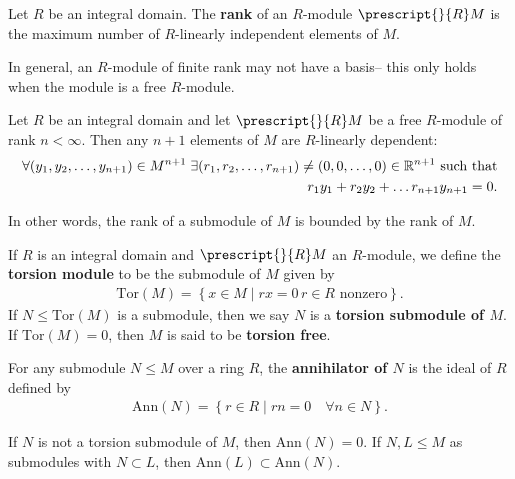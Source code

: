 \documentclass{memoir}
\begin{document}


\begin{defn}[Rank]
	Let \(R\) be an integral domain. The \textbf{rank} of an \(R\)-module \(\prescript{}{R}M\) is the maximum number of \(R\)-linearly independent elements of \(M\).
\end{defn}

In general, an \(R\)-module of finite rank may not have a basis-- this only holds when the module is a free \(R\)-module.

\begin{exmp}
	
\end{exmp}

\begin{prop}
	Let \(R\) be an integral domain and let \(\prescript{}{R}M\) be a free \(R\)-module of rank \(n< \infty\). Then any \(n+1\) elements of \(M\) are \(R\)-linearly dependent:
	\begin{align*}
		\forall (y_1,y_2,\ldots,y_{n+1}) \in M^{n+1} \; \exists (r_1,r_2,\ldots,r_{n+1})\neq (0,0,\ldots,0) \in \mathbb{R}^{n+1} \text{ such that}\\
		r_1y_1 + r_2y_2 + \ldots r_{n+1}y_{n+1} = 0.
	\end{align*}
\end{prop}
In other words, the rank of a submodule of \(M\) is bounded by the rank of \(M\).

\begin{defn}
	If \(R\) is an integral domain and \(\prescript{}{R}M\) an \(R\)-module, we define the \textbf{torsion module} to be the submodule of \(M\) given by
	\begin{align*}
		\textrm{Tor}(M) = \left\{x \in M \mid rx = 0 \, r\in R \text{ nonzero} \right\} .
	\end{align*}
	If \(N \leq \textrm{Tor}(M)\) is a submodule, then we say \(N\) is a \textbf{torsion submodule of \(M\)}.\\

	If \(\textrm{Tor}(M) = 0\), then \(M\) is said to be \textbf{torsion free}.
\end{defn}
\begin{defn}[Annihilator]
	For any submodule \(N\leq M\) over a ring \(R\), the \textbf{annihilator of \(N\)} is the ideal of \(R\) defined by
	\begin{align*}
		\textrm{Ann}(N) = \left\{r \in R \mid rn = 0 \quad \forall n \in N \right\} .
	\end{align*}
\end{defn}
If \(N\) is not a torsion submodule of \(M\), then \(\textrm{Ann}(N) = 0\). If \(N,L \leq M\) as submodules with \(N\subset L\), then \(\textrm{Ann}(L) \subset \textrm{Ann}(N)\).\\
\end{document}
